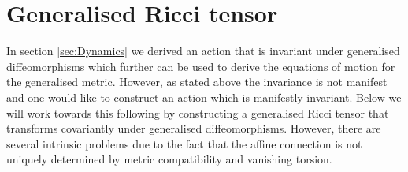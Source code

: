 \section{Generalised Ricci tensor}
In section \ref{sec:Dynamics} we derived an action that is invariant under generalised diffeomorphisms which further can be used to derive the equations of motion for the generalised metric. However, as stated above the invariance is not manifest and one would like to construct an action which is manifestly invariant. Below we will work towards this following \cite{Cederwall:2013naa} by constructing a generalised Ricci tensor that transforms covariantly under generalised diffeomorphisms. However, there are several intrinsic problems due to the fact that the affine connection is not uniquely determined by metric compatibility and vanishing torsion. 

